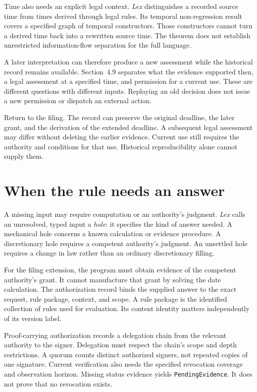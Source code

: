 \documentclass{momentum}
\begin{document}
Time also needs an explicit legal context. \emph{Lex} distinguishes a recorded source time from times derived through legal rules. Its temporal non-regression result covers a specified graph of temporal constructors. Those constructors cannot turn a derived time back into a rewritten source time. The theorem does not establish unrestricted information-flow separation for the full language. \cite[Section~3.2, temporal rule-graph non-regression]{lex}

A later interpretation can therefore produce a new assessment while the historical record remains available. Section~4.9 separates what the evidence supported then, a legal assessment at a specified time, and permission for a current use. These are different questions with different inputs. Replaying an old decision does not issue a new permission or dispatch an external action.

Return to the filing. The record can preserve the original deadline, the later grant, and the derivation of the extended deadline. A subsequent legal assessment may differ without deleting the earlier evidence. Current use still requires the authority and conditions for that use. Historical reproducibility alone cannot supply them. \cite[Sections~3.3, 4.9, and~7.7]{lex}

\section{When the rule needs an answer}

A missing input may require computation or an authority's judgment. \emph{Lex} calls an unresolved, typed input a \emph{hole}: it specifies the kind of answer needed. A mechanical hole concerns a known calculation or evidence procedure. A discretionary hole requires a competent authority's judgment. An unsettled hole requires a change in law rather than an ordinary discretionary filling. \cite[Section~3.5]{lex}

For the filing extension, the program must obtain evidence of the competent authority's grant. It cannot manufacture that grant by solving the date calculation. The authorization record binds the supplied answer to the exact request, rule package, context, and scope. A rule package is the identified collection of rules used for evaluation. Its content identity matters independently of its version label. \cite[Sections~3.3, 4.7, and~7.7]{lex}

Proof-carrying authorization records a delegation chain from the relevant authority to the signer. Delegation must respect the chain's scope and depth restrictions. A quorum counts distinct authorized signers, not repeated copies of one signature. Current verification also needs the specified revocation coverage and observation horizon. Missing status evidence yields \texttt{PendingEvidence}. It does not prove that no revocation exists. \cite[Sections~3.5 and~4.7--4.9]{lex}
\end{document}
